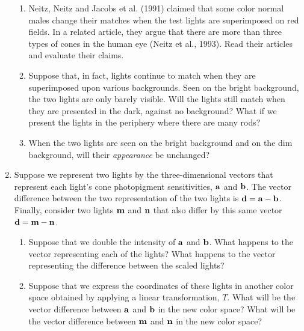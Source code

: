 \begin{enumerate}
\begin{enumerate}
\item Neitz, Neitz and Jacobs et al. (1991) 
claimed that some color normal males change their matches
when the test lights are superimposed on red fields.
In a related article,
they argue that there are more than three types
of cones in the human eye (Neitz et al., 1993).
Read their articles and evaluate their claims.

 \item Suppose that, in fact,
lights continue to match when they are superimposed
upon various backgrounds.
Seen on the bright background, the two lights are only barely visible.
Will the lights still match when they are presented 
in the dark, against no background?
What if we  present the lights in the periphery where there are many rods?

 \item  When the two lights are seen on the bright background
and on the dim background, will their
{\em appearance} be unchanged?

 \end{enumerate}

\item Suppose we represent two lights by the
three-dimensional vectors that represent
each light's cone photopigment sensitivities, $\bf a$ and $\bf b$.
The vector difference between the
two representation of the two lights is $\bf d = \bf a  - \bf b $.
Finally, consider two lights $\bf m$ and $\bf n$ that also differ
by this same vector $\bf d = \bf m - \bf n$.

 \begin{enumerate}

 \item Suppose that we double the intensity of $\bf a$ and $\bf b$.
What happens to the vector representing each of the lights?
What happens to the vector representing the difference
between the scaled lights?

 \item  Suppose that we express the coordinates of these lights
in another color space obtained by applying
a linear transformation, $T$.
What will be the vector difference between $\bf a$ and $\bf b$
in the new color space?
What will be the vector difference between $\bf m$ and $\bf n$
in the new color space?


\end{enumerate}
\end{enumerate}

